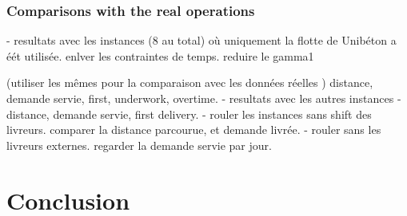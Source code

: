 \documentclass{article}
\begin{document}
\begin{table}[htbp]
    \centering
    \caption{Influence of the local search step on the  GRASP algorithm}
    \label{tab:grasp_ls_nols}
\end{table}

\subsubsection{Comparisons with the real operations}


- resultats avec les instances (8 au total) où uniquement la flotte de Unibéton a éét utilisée.
enlver les contraintes de temps. reduire le gamma1


(utiliser les mêmes pour la comparaison avec les données réelles )
distance, demande servie, first, underwork, overtime.
- resultats avec les autres instances
- distance, demande servie, first delivery.
- rouler les instances sans shift des livreurs. comparer la distance parcourue, et demande livrée.
- rouler sans les livreurs externes. regarder la demande servie par jour. 

\section{Conclusion}
\label{concl}
\end{document}
